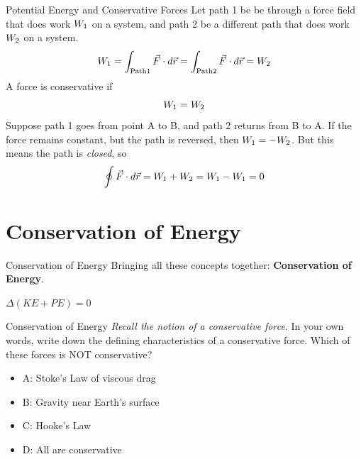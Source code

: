 \documentclass{beamer}
\begin{document}
\begin{frame}{Potential Energy and Conservative Forces}
Let path 1 be be through a force field that does work $W_{\rm 1}$ on a system, and path 2 be a different path that does work $W_{\rm 2}$ on a system.
\begin{equation}
W_{\rm 1} = \int_{\rm Path 1} \vec{F}\cdot d\vec{r} = \int_{\rm Path 2} \vec{F} \cdot d\vec{r} = W_{\rm 2}
\end{equation}
A force is conservative if 
\begin{equation}
W_{\rm 1} = W_{\rm 2}
\end{equation}
Suppose path 1 goes from point A to B, and path 2 returns from B to A.  If the force remains constant, but the path is reversed, then $W_{\rm 1} = -W_{\rm 2}$.  But this means the path is \textit{closed}, so 
\begin{equation}
\oint \vec{F} \cdot d\vec{r} = W_{\rm 1} + W_{\rm 2} = W_{\rm 1} - W_{\rm 1} = 0
\end{equation}
\end{frame}

\section{Conservation of Energy}

\begin{frame}{Conservation of Energy}
Bringing all these concepts together: \alert{\textbf{Conservation of Energy}}. \\ \vspace{1cm}
\begin{tcolorbox}[colback=white,colframe=red!40!blue,title=Conservation of Energy]
\alert{$\Delta (KE + PE) = 0$}
\end{tcolorbox}
\end{frame}

\begin{frame}{Conservation of Energy}
\textit{Recall the notion of a conservative force}.  In your own words, write down the defining characteristics of a conservative force.  Which of these forces is NOT conservative?
\begin{itemize}
\item A: Stoke's Law of viscous drag
\item B: Gravity near Earth's surface
\item C: Hooke's Law
\item D: All are conservative
\end{itemize}
\end{frame}
\end{document}
